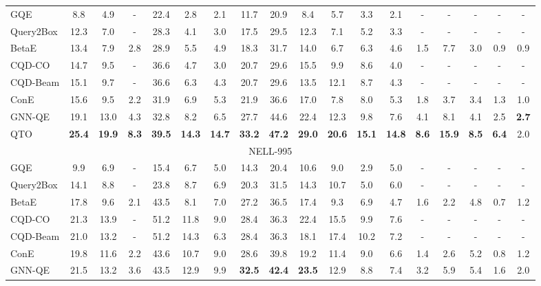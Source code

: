 \begin{table*}[!h]
\begin{adjustbox}{width=\textwidth}
\begin{tabular}{lccccccccccccccccc}
        \midrule
        GQE & 8.8 & 4.9 & - & 22.4 & 2.8 & 2.1 & 11.7 & 20.9 & 8.4 & 5.7 & 3.3 & 2.1 & - & - & - & - & - \\
        Query2Box & 12.3 & 7.0 & - & 28.3 & 4.1 & 3.0 & 17.5 & 29.5 & 12.3 & 7.1 & 5.2 & 3.3 & - & - & - & - & - \\
        BetaE & 13.4 & 7.9 & 2.8 & 28.9 & 5.5 & 4.9 & 18.3 & 31.7 & 14.0 & 6.7 & 6.3 & 4.6 & 1.5 & 7.7 & 3.0 & 0.9 & 0.9 \\
        CQD-CO & 14.7 & 9.5 & - & 36.6 & 4.7 & 3.0 & 20.7 & 29.6 & 15.5 & 9.9 & 8.6 & 4.0 & - & - & - & - & - \\
        CQD-Beam & 15.1 & 9.7 & - & 36.6 & 6.3 & 4.3 & 20.7 & 29.6 & 13.5 & 12.1 & 8.7 & 4.3 & - & - & - & - & - \\
        ConE & 15.6 & 9.5 & 2.2 & 31.9 & 6.9 & 5.3 & 21.9 & 36.6 & 17.0 & 7.8 & 8.0 & 5.3 & 1.8 & 3.7 & 3.4 & 1.3 & 1.0 \\
        GNN-QE & 19.1 & 13.0 & 4.3 & 32.8 & 8.2 & 6.5 & 27.7 & 44.6 & 22.4 & 12.3 & 9.8 & 7.6 & 4.1 & 8.1 & 4.1 & 2.5 & \bf{2.7} \\
        \midrule
        QTO & \bf{25.4} & \bf{19.9} & \bf{8.3} & \bf{39.5} & \bf{14.3} & \bf{14.7} & \bf{33.2} & \bf{47.2} & \bf{29.0} & \bf{20.6} & \bf{15.1} & \bf{14.8} & \bf{8.6} & \bf{15.9} & \bf{8.5} & \bf{6.4} & 2.0 \\
        \midrule[0.08em]
        \multicolumn{18}{c}{NELL-995} \\
        \midrule
        GQE & 9.9 & 6.9 & - & 15.4 & 6.7 & 5.0 & 14.3 & 20.4 & 10.6 & 9.0 & 2.9 & 5.0 & - & - & - & - & - \\
        Query2Box & 14.1 & 8.8 & - & 23.8 & 8.7 & 6.9 & 20.3 & 31.5 & 14.3 & 10.7 & 5.0 & 6.0 & - & - & - & - & - \\
        BetaE & 17.8 & 9.6 & 2.1 & 43.5 & 8.1 & 7.0 & 27.2 & 36.5 & 17.4 & 9.3 & 6.9 & 4.7 & 1.6 & 2.2 & 4.8 & 0.7 & 1.2 \\
        CQD-CO & 21.3 & 13.9 & - & 51.2 & 11.8 & 9.0 & 28.4 & 36.3 & 22.4 & 15.5 & 9.9 & 7.6 & - & - & - & - & - \\
        CQD-Beam & 21.0 & 13.2 & - & 51.2 & 14.3 & 6.3 & 28.4 & 36.3 & 18.1 & 17.4 & 10.2 & 7.2 & - & - & - & - & - \\
        ConE & 19.8 & 11.6 & 2.2 & 43.6 & 10.7 & 9.0 & 28.6 & 39.8 & 19.2 & 11.4 & 9.0 & 6.6 & 1.4 & 2.6 & 5.2 & 0.8 & 1.2 \\
        GNN-QE & 21.5 & 13.2 & 3.6 & 43.5 & 12.9 & 9.9 & \bf{32.5} & \bf{42.4} & \bf{23.5} & 12.9 & 8.8 & 7.4 & 3.2 & 5.9 & 5.4 & 1.6 & 2.0 \\

\end{tabular}
\end{adjustbox}
\end{table*}
